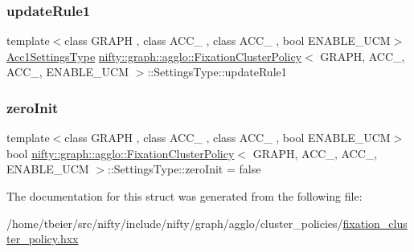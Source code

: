 \subsubsection{\texorpdfstring{update\+Rule1}{updateRule1}}
{\footnotesize\ttfamily template$<$class G\+R\+A\+PH , class A\+C\+C\+\_ , class A\+C\+C\+\_ , bool E\+N\+A\+B\+L\+E\+\_\+\+U\+CM$>$ \\
\hyperlink{classnifty_1_1graph_1_1agglo_1_1FixationClusterPolicy_ae3cf188ccd118291fbc2b0038b59c672}{Acc1\+Settings\+Type} \hyperlink{classnifty_1_1graph_1_1agglo_1_1FixationClusterPolicy}{nifty\+::graph\+::agglo\+::\+Fixation\+Cluster\+Policy}$<$ G\+R\+A\+PH, A\+C\+C\+\_, A\+C\+C\+\_, E\+N\+A\+B\+L\+E\+\_\+\+U\+CM $>$\+::Settings\+Type\+::update\+Rule1}

\mbox{\label{structnifty_1_1graph_1_1agglo_1_1FixationClusterPolicy_1_1SettingsType_a05d305057cf189b3d746e3d18710a980}} 
\subsubsection{\texorpdfstring{zero\+Init}{zeroInit}}
{\footnotesize\ttfamily template$<$class G\+R\+A\+PH , class A\+C\+C\+\_ , class A\+C\+C\+\_ , bool E\+N\+A\+B\+L\+E\+\_\+\+U\+CM$>$ \\
bool \hyperlink{classnifty_1_1graph_1_1agglo_1_1FixationClusterPolicy}{nifty\+::graph\+::agglo\+::\+Fixation\+Cluster\+Policy}$<$ G\+R\+A\+PH, A\+C\+C\+\_, A\+C\+C\+\_, E\+N\+A\+B\+L\+E\+\_\+\+U\+CM $>$\+::Settings\+Type\+::zero\+Init = false}



The documentation for this struct was generated from the following file\+:\begin{DoxyCompactItemize}
\item 
/home/tbeier/src/nifty/include/nifty/graph/agglo/cluster\+\_\+policies/\hyperlink{fixation__cluster__policy_8hxx}{fixation\+\_\+cluster\+\_\+policy.\+hxx}\end{DoxyCompactItemize}
